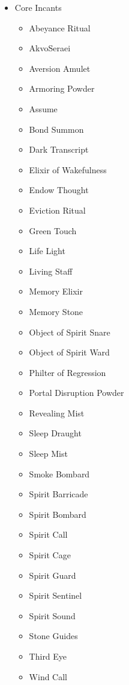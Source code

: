 \renewcommand{\labelenumii}{\arabic{enumii}.}
\begin{itemize}[leftmargin=0pt]
	\item[] Core Incants
	\begin{itemize}[leftmargin=0pt]
		\item[] Abeyance Ritual
		\item[] AkvoSeraei
		\item[] Aversion Amulet
		\item[] Armoring Powder
		\item[] Assume
		\item[] Bond Summon
		\item[] Dark Transcript
		\item[] Elixir of Wakefulness
		\item[] Endow Thought
		\item[] Eviction Ritual
		\item[] Green Touch
		\item[] Life Light
		\item[] Living Staff
		\item[] Memory Elixir
		\item[] Memory Stone
		\item[] Object of Spirit Snare
		\item[] Object of Spirit Ward
		\item[] Philter of Regression
		\item[] Portal Disruption Powder
		\item[] Revealing Mist
		\item[] Sleep Draught
		\item[] Sleep Mist
		\item[] Smoke Bombard
		\item[] Spirit Barricade
		\item[] Spirit Bombard
		\item[] Spirit Call
		\item[] Spirit Cage
		\item[] Spirit Guard
		\item[] Spirit Sentinel
		\item[] Spirit Sound
		\item[] Stone Guides
		\item[] Third Eye
		\item[] Wind Call
	\end{itemize}

\end{itemize}
